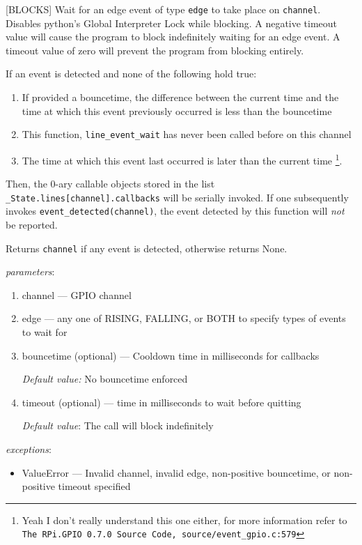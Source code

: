 \documentclass[12pt]{article}
\begin{document}
[BLOCKS] Wait for an edge event of type \texttt{edge} to take place on \texttt{channel}. Disables python's Global Interpreter Lock while blocking. A negative timeout value will cause the program to block indefinitely waiting for an edge event. A timeout value of zero will prevent the program from blocking entirely.

If an event is detected and none of the following hold true:
\begin{enumerate}
    \item If provided a bouncetime, the difference between the current time and the time at which this event previously occurred is less than the bouncetime
    \item This function, \texttt{line\_event\_wait} has never been called before on this channel
    \item The time at which this event last occurred is later than the current time \footnote{Yeah I don't really understand this one either, for more information refer to \texttt{The RPi.GPIO 0.7.0 Source Code, source/event\_gpio.c:579}\cite{rpigpio}}.
\end{enumerate}

Then, the 0-ary callable objects stored in the list \texttt{\_State.lines[channel].callbacks} will be serially invoked. If one subsequently invokes \texttt{event\_detected(channel)}, the event detected by this function will \textit{not} be reported.

Returns \texttt{channel} if any event is detected, otherwise returns None.

\textit{parameters}:
\begin{enumerate}      
        \item channel --- GPIO channel
        \item edge --- any one of RISING, FALLING, or BOTH to specify types of events to wait for
        \item bouncetime (optional) --- Cooldown time in milliseconds for callbacks
        
        \textit{Default value:} No bouncetime enforced
        \item timeout (optional) --- time in milliseconds to wait before quitting
        
        \textit{Default value}: The call will block indefinitely
\end{enumerate}
 
 
\textit{exceptions}:
\begin{itemize}
    \item ValueError --- Invalid channel, invalid edge, non-positive bouncetime, or  non-positive timeout specified
\end{itemize}
\end{document}
